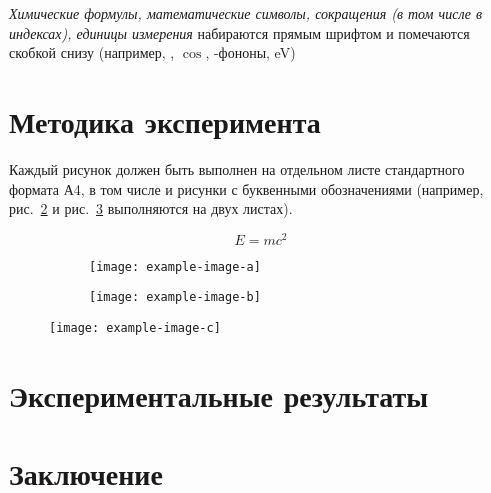 \documentclass[14pt]{extarticle}
\begin{document}
\textit{Химические формулы, математические символы, сокращения (в том числе в 
индексах), единицы измерения} набираются прямым шрифтом и помечаются скобкой 
снизу (например, , $\cos$, -фононы, 
\si{\eV})
\section{Методика эксперимента}

Каждый рисунок должен быть выполнен на отдельном листе стандартного формата А4,
в том числе и рисунки с буквенными обозначениями (например, рис.~\ref{fig1} и рис.~\ref{fig2} выполняются на двух листах).

\begin{equation}
E = mc^2
\label{eq:1}
\end{equation}


\begin{figure}
	\centering
	\begin{subfigure}[]{80mm}
		\texttt{[image: example-image-a]}
		\caption[]{\label{fig1}}
	\end{subfigure}
	\caption[]{}
\end{figure}

\begin{figure}
	\ContinuedFloat
	\centering
	\begin{subfigure}[]{80mm}

		\texttt{[image: example-image-b]}
		\caption[]{\label{fig2}}
	\end{subfigure}
	\caption[Название рисунка, которое будет выводиться в списке иллюстраций]{\label{fig}}
\end{figure}

\begin{figure}
	\centering
	\texttt{[image: example-image-c]}
	\caption[Название второго рисунка]{\label{fig3}}
\end{figure}

\section{Экспериментальные результаты}

\section{Заключение}

\newpage


\end{document}
